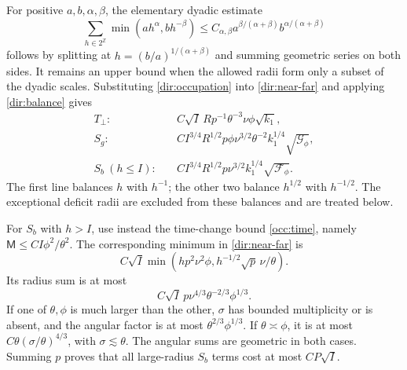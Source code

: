 For positive $a,b,\alpha,\beta$, the elementary dyadic estimate
\begin{equation}\label{dir:balance}
 \sum_{h\in2^{\mathbb Z}}
       \min(ah^\alpha,bh^{-\beta})
 \le C_{\alpha,\beta}
       a^{\beta/(\alpha+\beta)}b^{\alpha/(\alpha+\beta)}
\end{equation}
follows by splitting at $h=(b/a)^{1/(\alpha+\beta)}$ and summing
geometric series on both sides.  It remains an upper bound when the
allowed radii form only a subset of the dyadic scales.
Substituting \eqref{dir:occupation} into \eqref{dir:near-far} and
applying \eqref{dir:balance} gives
\begin{equation}\label{dir:balanced}
 \begin{aligned}
 T_\perp:&\quad
 C\sqrt I\,R p^{-1}\theta^{-3}\nu\phi\sqrt{k_1},\\
 S_g:&\quad
 C I^{3/4}R^{1/2}p\phi\nu^{3/2}\theta^{-2}
       k_1^{1/4}\sqrt{\mathcal G_\phi},\\
 S_b\ (h\le I):&\quad
 C I^{3/4}R^{1/2}p\nu^{3/2}k_1^{1/4}
       \sqrt{\mathcal F_\phi}.
 \end{aligned}
\end{equation}
The first line balances $h$ with $h^{-1}$; the other two balance
$h^{1/2}$ with $h^{-1/2}$.  The exceptional deficit radii are excluded
from these balances and are treated below.

For $S_b$ with $h>I$, use instead the time-change bound
\eqref{occ:time}, namely $\mathsf M\le CI\phi^2/\theta^2$.
The corresponding minimum in \eqref{dir:near-far} is
\[
 C\sqrt I\min\left(hp^2\nu^2\phi,
                     h^{-1/2}\sqrt p\,\nu/\theta\right).
\]
Its radius sum is at most
\begin{equation}\label{dir:large-radius}
 C\sqrt I\,p\nu^{4/3}\theta^{-2/3}\phi^{1/3}.
\end{equation}
If one of $\theta,\phi$ is much larger than the other, $\sigma$ has
bounded multiplicity or is absent, and the angular factor is at most
$\theta^{2/3}\phi^{1/3}$.  If $\theta\asymp\phi$, it is at most
$C\theta(\sigma/\theta)^{4/3}$, with $\sigma\lesssim\theta$.
The angular sums are geometric in both cases.  Summing $p$ proves
that all large-radius $S_b$ terms cost at most $CP\sqrt I$.

